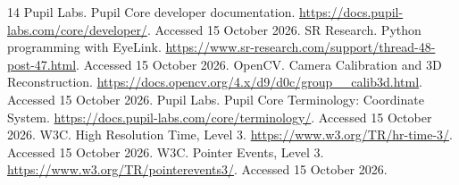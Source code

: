 \documentclass[sigconf,screen,nonacm]{acmart}
\begin{document}
\begin{thebibliography}{14}
 Pupil Labs. Pupil Core developer documentation. \url{https://docs.pupil-labs.com/core/developer/}. Accessed 15 October 2026.
 SR Research. Python programming with EyeLink. \url{https://www.sr-research.com/support/thread-48-post-47.html}. Accessed 15 October 2026.
 OpenCV. Camera Calibration and 3D Reconstruction. \url{https://docs.opencv.org/4.x/d9/d0c/group__calib3d.html}. Accessed 15 October 2026.
 Pupil Labs. Pupil Core Terminology: Coordinate System. \url{https://docs.pupil-labs.com/core/terminology/}. Accessed 15 October 2026.
 W3C. High Resolution Time, Level 3. \url{https://www.w3.org/TR/hr-time-3/}. Accessed 15 October 2026.
 W3C. Pointer Events, Level 3. \url{https://www.w3.org/TR/pointerevents3/}. Accessed 15 October 2026.
\end{thebibliography}
\end{document}
